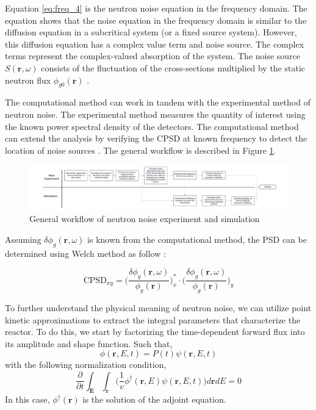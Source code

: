 Equation \ref{eq:freq_4} is the neutron noise equation in the frequency domain. The equation shows that the noise equation in the frequency domain is similar to the diffusion equation in a subcritical system (or a fixed source system). However, this diffusion equation has a complex value term and noise source. The complex terms represent the complex-valued absorption of the system. The noise source  $S (\textbf{r}, \omega)$ consists of the fluctuation of the cross-sections multiplied by the static neutron flux $\phi_{g0} (\textbf{r})$ \cite{pazsitDynamicAdjointGreen2015}. 

The computational method can work in tandem with the experimental method of neutron noise. The experimental method measures the quantity of interest using the known power spectral density of the detectors. The computational method can extend the analysis by verifying the CPSD at known frequency to detect the location of noise sources \cite{hursinModelingNoiseExperiments2023}. The general workflow is described in Figure \ref{fig:flow_diagram}.
\begin{figure}[h]
        \centering
        \includegraphics[width=\textwidth]{Picture1.png}
        \caption{General workflow of neutron noise experiment and simulation}
        \label{fig:flow_diagram}
\end{figure}

Assuming $\delta \phi_g (\textbf{r},\omega)$ is known from the computational method, the PSD can be determined using Welch method as follow \cite{mylonakisCORESIMSIMULATIONS2021}:

\begin{equation}
        \text{CPSD}_{xy} = \biggl(\frac{\delta \phi_{g}(\textbf{r}, \omega)}{\phi_{g}(\textbf{r})} \biggr)_x^* \cdot \biggl(\frac{\delta \phi_{g}(\textbf{r}, \omega)}{\phi_{g}(\textbf{r})} \biggr)_y
        \label{eq:CPSD_comp}
\end{equation}

To further understand the physical meaning of neutron noise, we can utilize point kinetic approximations to extract the integral parameters that characterize the reactor. To do this, we start by factorizing the time-dependent forward flux into its amplitude and shape function. Such that,
\begin{equation}
        \phi (\textbf{r}, E, t) = P(t) \psi (\textbf{r}, E, t)
\end{equation}
with the following normalization condition,
\begin{equation}\label{eq:normalization}
        \frac{\partial}{\partial t} \int_{\textbf{E}} \int_{\textbf{r}} \biggl( \frac{1}{v} \phi^{\dagger}(\textbf{r}, E) \psi (\textbf{r}, E, t) \biggr) d\textbf{r} dE = 0
\end{equation}
In this case, $\phi^{\dagger}(\textbf{r})$ is the solution of the adjoint equation. 

